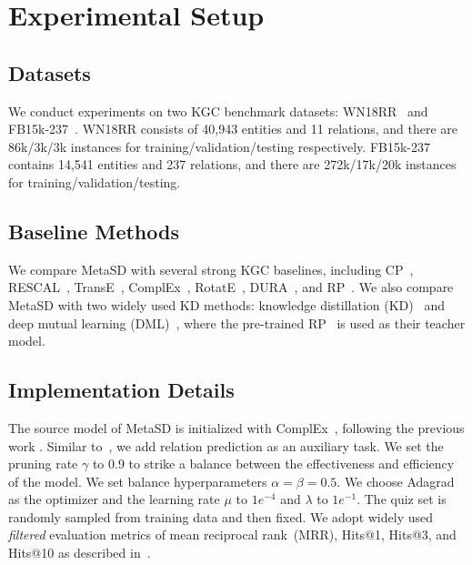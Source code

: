 \documentclass[11pt]{article}
\begin{document}
\section{Experimental Setup}
\subsection{Datasets}
We conduct experiments on two KGC benchmark datasets: WN18RR~\citep{toutanova2015observed} and FB15k-237~\citep{dettmers2018convolutional}. WN18RR consists of 40,943 entities and 11 relations, and there are 86k/3k/3k instances for training/validation/testing respectively. FB15k-237 contains 14,541 entities and 237 relations, and there are 272k/17k/20k instances for training/validation/testing.





\subsection{Baseline Methods}
We compare  MetaSD with several strong KGC baselines, including CP~\citep{hit1927},  RESCAL~\citep{nickel2011three}, TransE~\citep{bordes2013translating}, ComplEx~\citep{trouillon2016complex},
RotatE~\citep{sun2019rotate},
DURA~\citep{zhang2020duality}, and RP~\citep{chen2021relation}.  We also compare MetaSD with two widely used KD methods: knowledge distillation (KD)~\citep{hinton2015distilling} and deep mutual learning (DML)~\citep{zhang2018deep}, where the pre-trained RP~\citep{chen2021relation} is used as their teacher model. 

\subsection{Implementation Details}
The source model of MetaSD is initialized with ComplEx~\citep{trouillon2016complex}, following the previous work \citep{zhang2020duality}. Similar to~\citet{chen2021relation}, we add relation prediction as an auxiliary task. We set the pruning rate $\gamma$ to 0.9 to strike a balance between the effectiveness and efficiency of the model.
We set balance hyperparameters $\alpha = \beta = 0.5$. We choose Adagrad~\citep{duchi2011adaptive} as the optimizer and the learning rate $\mu$ to $1e^{-4}$ and $\lambda$ to $1e^{-1}$. The quiz set is randomly sampled from training data and then fixed. We adopt widely used \textit{filtered} evaluation metrics of mean reciprocal rank~(MRR), Hits@1, Hits@3, and Hits@10 as described in~\cite{bordes2013translating}.
\end{document}
